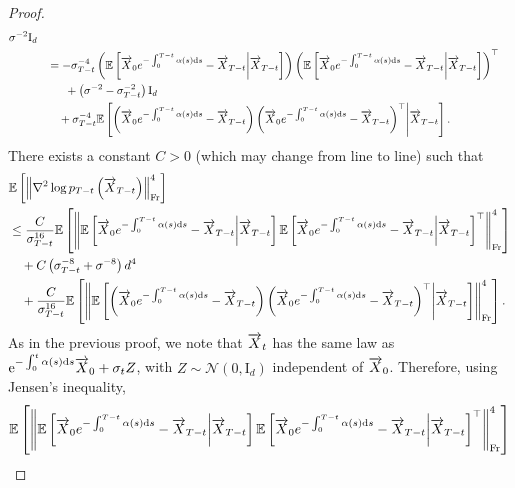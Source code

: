\documentclass[english,graybox,envcountchap,envcountsame,sectrefs,shortlabels]{svmono}
\theoremstyle{style}
\newcommand{\rme}{\mathrm{e}}
\newcommand{\eqsp}{}
\begin{document}
\begin{proof}
\begin{align*}
    \sigma^{-2}\mathrm{I}_d
    \\
    &\hspace{.3cm} = - \sigma_{T-t}^{-4}  \left(\mathbb{E} \left[ \ora X_0 e^{- \int_0^{T-t} \alpha (s) \rmd s} - \ora X_{T-t} \middle| \ora X_{T-t}\right] \right)\left( \mathbb{E} \left[    \ora X_0 e^{- \int_0^{T-t} \alpha (s) \rmd s} - \ora X_{T-t}  \middle| \ora X_{T-t}  \right] \right)^\top \\
    & \hspace{.5cm}\quad  + \left(\sigma^{-2}- \sigma_{T-t}^{-2}\right) \mathrm{I}_d 
    \\
   & \hspace{.3cm}\quad
   + \sigma_{T-t}^{-4}  \mathbb{E} \left[ \left(\ora X_0 e^{- \int_0^{T-t} \alpha (s) \rmd s} - \ora X_{T-t} \right) \left(\ora X_0 e^{- \int_0^{T-t} \alpha (s) \rmd s} - \ora X_{T-t} \right)^\top \middle| \ora X_{T-t} \right]\eqsp.
\end{align*}
There exists a constant $C>0$ (which may change from line to line) such that
\begin{align*}
    &\mathbb{E} \left[ \left\| \nabla^2 \log p_{T-t} \left( \overrightarrow X_{T-t} \right) \right\|^4_{\mathrm{Fr}} \right]\\
    & \leq \frac{C}{\sigma_{T-t}^{16}} \mathbb{E} \left[\left\| \mathbb{E} \left[ \overrightarrow X_0 e^{- \int_0^{T-t} \alpha (s) \mathrm{d} s} - \overrightarrow X_{T-t} \middle| \overrightarrow X_{T-t}\right] \mathbb{E} \left[    \overrightarrow X_0 e^{- \int_0^{T-t} \alpha (s) \mathrm{d} s} - \overrightarrow X_{T-t}  \middle| \overrightarrow X_{T-t}   \right]^\top \right\|^4_{\mathrm{Fr}} \right]
    \\
    & \quad + C \left(\sigma^{-8}_{T-t}+ \sigma^{-8}\right) d^4
    \\
    & \quad + \frac{C}{\sigma_{T-t}^{16}} \mathbb{E } \left[ \left\| \mathbb{E} \left[ \left(\overrightarrow X_0 e^{- \int_0^{T-t} \alpha (s) \mathrm{d} s} - \overrightarrow X_{T-t} \right) \left(\overrightarrow X_0 e^{- \int_0^{T-t} \alpha (s) \mathrm{d} s} - \overrightarrow X_{T-t} \right)^\top 
    \middle| \overrightarrow X_{T-t} \right]  \right\|^4_{\mathrm{Fr}} \right].
\end{align*}
As in the previous proof, we note that $\overrightarrow X_t$ has the same law as $\rme^{-\int_0^t \alpha(s) \rmd s} \ora X_0  + \sigma_t Z$, with $Z \sim \mathcal{N}(0, \mathrm{I}_d)$ independent of $\overrightarrow X_0$. Therefore, using Jensen's inequality,
\begin{align*}
    & \mathbb{E} \left[\left\| \mathbb{E} \left[ \ora X_0 e^{- \int_0^{T-t} \alpha (s) \rmd s} - \ora X_{T-t} \middle| \ora X_{T-t}\right] \mathbb{E} \left[    \ora X_0 e^{- \int_0^{T-t} \alpha (s) \rmd s} - \ora X_{T-t}  \middle| \ora X_{T-t}   \right]^\top \right\|^4_{\mathrm{Fr}} \right] \\

\end{align*}
\end{proof}
\end{document}
